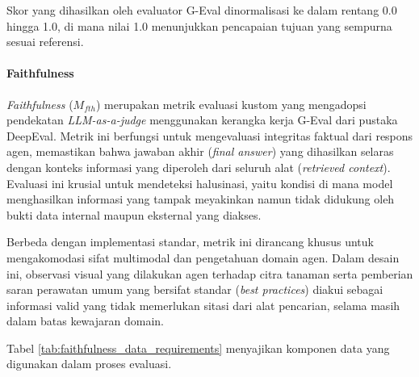 Skor yang dihasilkan oleh evaluator G-Eval dinormalisasi ke dalam rentang 0.0 hingga 1.0, di mana nilai 1.0 menunjukkan pencapaian tujuan yang sempurna sesuai referensi.

\paragraph{Faithfulness}
\textit{Faithfulness} ($M_{fth}$) merupakan metrik evaluasi kustom yang mengadopsi pendekatan \textit{LLM-as-a-judge} menggunakan kerangka kerja G-Eval dari pustaka DeepEval. Metrik ini berfungsi untuk mengevaluasi integritas faktual dari respons agen, memastikan bahwa jawaban akhir (\textit{final answer}) yang dihasilkan selaras dengan konteks informasi yang diperoleh dari seluruh alat (\textit{retrieved context}). Evaluasi ini krusial untuk mendeteksi halusinasi, yaitu kondisi di mana model menghasilkan informasi yang tampak meyakinkan namun tidak didukung oleh bukti data internal maupun eksternal yang diakses.

Berbeda dengan implementasi standar, metrik ini dirancang khusus untuk mengakomodasi sifat multimodal dan pengetahuan domain agen. Dalam desain ini, observasi visual yang dilakukan agen terhadap citra tanaman serta pemberian saran perawatan umum yang bersifat standar (\textit{best practices}) diakui sebagai informasi valid yang tidak memerlukan sitasi dari alat pencarian, selama masih dalam batas kewajaran domain.

Tabel \ref{tab:faithfulness_data_requirements} menyajikan komponen data yang digunakan dalam proses evaluasi.

\begin{table}[H]
    \centering
    \caption{Kebutuhan Data untuk Evaluasi Faithfulness}
    \label{tab:faithfulness_data_requirements}
    \small
\end{table}

